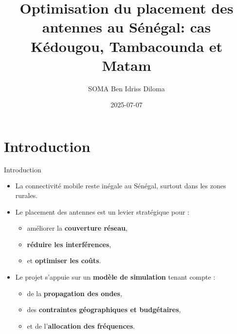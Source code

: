 \documentclass[
  ignorenonframetext,
]{beamer}
\title{Optimisation du placement des antennes au Sénégal: cas Kédougou,
Tambacounda et Matam}
\author{SOMA Ben Idriss Diloma}
\date{2025-07-07}
\providecommand{\tightlist}{%
  \setlength{\itemsep}{0pt}\setlength{\parskip}{0pt}}
\begin{document}
\frame{\titlepage}

\begin{frame}[allowframebreaks]
  \tableofcontents[hideallsubsections]
\end{frame}
\section{Introduction}\label{introduction}

\begin{frame}{Introduction}
\begin{itemize}
\tightlist
\item
  La connectivité mobile reste inégale au Sénégal, surtout dans les
  zones rurales.
\item
  Le placement des antennes est un levier stratégique pour :

  \begin{itemize}
  \tightlist
  \item
    améliorer la \textbf{couverture réseau},
  \item
    \textbf{réduire les interférences},
  \item
    et \textbf{optimiser les coûts}.
  \end{itemize}
\item
  Le projet s'appuie sur un \textbf{modèle de simulation} tenant compte
  :

  \begin{itemize}
  \tightlist
  \item
    de la \textbf{propagation des ondes},
  \item
    des \textbf{contraintes géographiques et budgétaires},
  \item
    et de l'\textbf{allocation des fréquences}.
  \end{itemize}
\end{itemize}
\end{frame}
\end{document}
